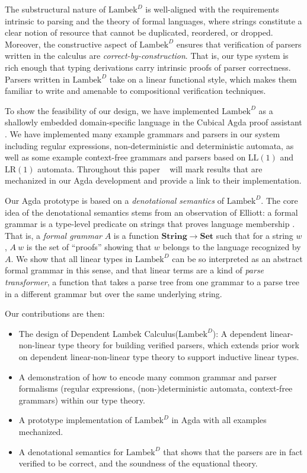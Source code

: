 \documentclass[acmsmall,nonacm]{acmart}
\newcommand{\StringSem}{\mathbf{String}}
\newcommand{\Set}{\mathbf{Set}}
\newcommand{\theoryname}{Dependent Lambek Calculus\xspace}
\newcommand{\theoryabbv}{$\textrm{Lambek}^D$\xspace}
\newcommand{\LLL}{\textrm{LL}}
\newcommand{\LRR}{\textrm{LR}}
\newcommand{\LL}[1]{\LLL(#1)}
\newcommand{\LR}[1]{\LRR(#1)}
\newcommand{\agdalogo}{%
  \usebox{\logoagdabox}}%
\newcommand{\zenodolink}{https://zenodo.org/records/15049780}
\newcommand{\Agda}{\href{\zenodolink}{\agdalogo}}
\begin{document}
The substructural nature of \theoryabbv is well-aligned with the
requirements intrinsic to parsing and the theory of formal
languages, where strings constitute a clear notion of resource
that cannot be duplicated, reordered, or dropped. Moreover, the constructive
aspect of \theoryabbv ensures that verification of parsers written in the
calculus are \emph{correct-by-construction}. That is, our type system is rich
enough that typing derivations carry intrinsic proofs of parser correctness.
Parsers written in \theoryabbv take on a linear functional style, which makes
them familiar to write and amenable to compositional verification techniques.

To show the feasibility of our design, we have implemented \theoryabbv
as a shallowly embedded domain-specific language in the Cubical Agda
proof assistant \cite{VezzosiMortbergAbel2019}. We have implemented many example
grammars and parsers in our system including regular expressions,
non-deterministic and deterministic automata, as well as some example
context-free grammars and parsers based on $\LL{1}$ and $\LR{1}$
automata. Throughout this paper \Agda~ will mark
results that are mechanized in our Agda development and provide a link to their
implementation.

Our Agda prototype is based on a \emph{denotational semantics} of
\theoryabbv. The core idea of the denotational semantics stems from an observation of Elliott:
a formal grammar is a type-level predicate on strings that proves
language membership \cite{elliottSymbolicAutomaticDifferentiation2021}. That is, a \emph{formal grammar} $A$ is a
function $\StringSem \to \Set$ such that for a string $w$, $A~w$ is the
set of ``proofs'' showing that $w$ belongs to the language recognized
by $A$. We show that all linear types in \theoryabbv can be so
interpreted as an abstract formal grammar in this sense, and that
linear terms are a kind of \emph{parse transformer}, a function that
takes a parse tree from one grammar to a parse tree in a different
grammar but over the same underlying string.

Our contributions are then:
%
\begin{itemize}
  \item The design of \theoryname (\theoryabbv): A dependent
    linear-non-linear type theory for building verified parsers, which
    extends prior work on dependent linear-non-linear type theory to
    support inductive linear types.
  \item A demonstration of how to encode many common grammar and parser formalisms
    (regular expressions, (non-)deterministic automata, context-free
    grammars) within our type theory.
  \item A prototype implementation of \theoryabbv in Agda with all
    examples mechanized.
  \item A denotational semantics for \theoryabbv that shows that the
    parsers are in fact verified to be correct, and the soundness of the
    equational theory.
\end{itemize}
\end{document}
